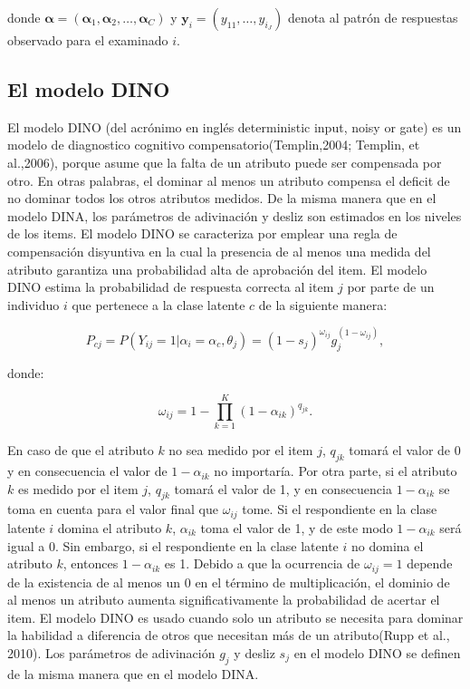 			donde $\boldsymbol{\alpha}=\left(\boldsymbol{\alpha}_{1}, \boldsymbol{\alpha}_{2}, \ldots, \boldsymbol{\alpha}_{C}\right)$ y ${ \boldsymbol{y} }_{i}=\left( y_{ 11 },\ldots ,y_{ i_{J} } \right)$ denota al patr\'{o}n de respuestas observado para el examinado $i$.
			
	
		\subsection{El modelo DINO}
			El modelo DINO (del acr\'{o}nimo en ingl\'{e}s deterministic input, noisy or gate) es un modelo de diagnostico cognitivo compensatorio(Templin,2004; Templin, et al.,2006), porque asume que la falta de un atributo puede ser compensada por otro. En otras palabras, el dominar al menos un atributo compensa el deficit de no dominar todos los otros atributos medidos.
			De la misma manera que en el modelo DINA, los par\'{a}metros de adivinaci\'{o}n y desliz son estimados en los niveles de los items. El modelo DINO se caracteriza por emplear una regla de compensaci\'{o}n disyuntiva en la cual la presencia de al menos una medida del atributo garantiza una probabilidad alta de aprobaci\'{o}n del item.
			El modelo DINO estima la probabilidad de respuesta correcta al item $j$ por parte de un individuo $i$ que pertenece a la clase latente $c$ de la siguiente manera:
			
			\begin{equation}
				P_{cj}=P\left(Y_{i j}=1 |{ \alpha  }_{ i }={ \alpha}_{ c },{ \theta  }_{ j }\right)=\left(1-s_{j}\right)^{\omega_{i j}} g_{j}^{\left(1-\omega_{i j}\right)}, \label{2.33}  	
			\end{equation}
			
			donde:
			
			\begin{equation}
				\omega_{ ij }=1-\prod_{k=1}^{K}\left(1-\alpha_{i k}\right)^{q_{j k}}.  \label{2.34}  	
			\end{equation}
			
			En caso de que el atributo $k$ no sea medido por el item $j$, $q_{j k}$ tomar\'{a} el valor de 0 y en consecuencia el valor de $1-\alpha_{i k}$ no importar\'{i}a. Por otra parte, si el atributo $k$ es medido por el item $j$,  $q_{j k}$ tomar\'{a} el valor de 1, y en consecuencia  $1-\alpha_{i k}$ se toma en cuenta para el valor final que ${ \omega  }_{ ij }$ tome. Si el respondiente en la clase latente $i$ domina el atributo $k$,  $\alpha_{i k}$ toma el valor de 1, y de este modo $1-\alpha_{i k}$ ser\'{a} igual a 0. Sin embargo, si el respondiente en la clase latente $i$ no domina el atributo $k$, entonces  $1-\alpha_{i k}$ es 1. 
			Debido a que la ocurrencia de ${ \omega  }_{ ij }=1$ depende de la existencia de al menos un 0 en el t\'{e}rmino de multiplicaci\'{o}n, el dominio de al menos un atributo aumenta significativamente la probabilidad de acertar el item.
			El modelo DINO es usado cuando solo un atributo se necesita para dominar la habilidad a diferencia de otros que necesitan m\'{a}s de un atributo(Rupp et al., 2010). Los par\'{a}metros de adivinaci\'{o}n ${ g }_{ j }$ y desliz ${ s }_{ j }$ en el modelo DINO se definen de la misma manera que en el modelo DINA.      
			
